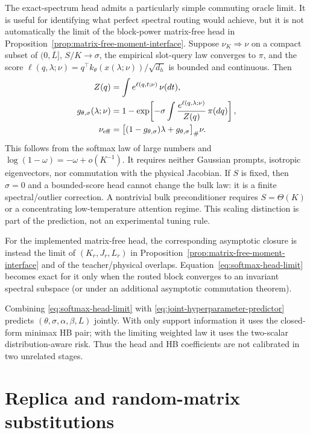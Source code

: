\documentclass[11pt]{article}
\begin{document}
The exact-spectrum head admits a particularly simple commuting oracle limit.
It is useful for identifying what perfect spectral routing would achieve, but
it is not automatically the limit of the block-power matrix-free head in
Proposition~\ref{prop:matrix-free-moment-interface}.  Suppose
$\nu_K\Rightarrow\nu$ on a compact subset
of $(0,\overline L]$, $S/K\to\sigma$, the empirical slot-query law converges
to $\pi$, and the score
$\ell(q,\lambda;\nu)=q^\top k_\theta(x(\lambda;\nu))/\sqrt{d_h}$ is bounded
and continuous.  Then
\begin{equation}
\begin{aligned}
 Z(q)&=\int e^{\ell(q,t;\nu)}\,\nu(dt),\\
 g_{\theta,\sigma}(\lambda;\nu)
 &=1-\exp\!\left[-\sigma\int
 \frac{e^{\ell(q,\lambda;\nu)}}{Z(q)}\,\pi(dq)\right],\\
 \nu_{\rm eff}
 &=\bigl[(1-g_{\theta,\sigma})\lambda
       +g_{\theta,\sigma}\bigr]_{\#}\nu .
\end{aligned}
 \label{eq:softmax-head-limit}
\end{equation}
This follows from the softmax law of large numbers and
$\log(1-\omega)=-\omega+o(K^{-1})$.  It requires neither Gaussian prompts,
isotropic eigenvectors, nor commutation with the physical Jacobian.  If $S$
is fixed, then $\sigma=0$ and a bounded-score head cannot change the bulk
law: it is a finite spectral/outlier correction.  A nontrivial bulk
preconditioner requires $S=\Theta(K)$ or a concentrating low-temperature
attention regime.  This scaling distinction is part of the prediction, not
an experimental tuning rule.

For the implemented matrix-free head, the corresponding asymptotic closure
is instead the limit of
\((K_r,J_r,L_r)\) in Proposition~\ref{prop:matrix-free-moment-interface} and of
the teacher/physical overlaps.  Equation~\eqref{eq:softmax-head-limit}
becomes exact for it only when the routed block converges to an invariant
spectral subspace (or under an additional asymptotic commutation theorem).

Combining \eqref{eq:softmax-head-limit} with
\eqref{eq:joint-hyperparameter-predictor} predicts
$(\theta,\sigma,\alpha,\beta,L)$ jointly.  With only support information it
uses the closed-form minimax HB pair; with the limiting weighted law it uses
the two-scalar distribution-aware risk.  Thus the head and HB coefficients
are not calibrated in two unrelated stages.

\section{Replica and random-matrix substitutions}
\end{document}
